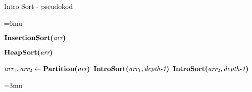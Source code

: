 \begin{frame}[squeeze]{Intro Sort - pseudokod}
	
	\begin{algorithm}[H]
		\unboldmath
		\thinmuskip=6mu
		\begin{algorithmic}[1]
			
			\State
			  \label{line:insertion-sort}
			\State $\textbf{InsertionSort(}\textit{arr}\textbf{)}$
			
			\State
			  \label{line:heap-sort}
			\State $\textbf{HeapSort(}\textit{arr}\textbf{)}$
			
			\State
			\Else {} \label{line:quick-sort}
			\State $\textit{arr}_1, \textit{arr}_2 \gets \textbf{Partition(}\textit{arr}\textbf{)}$
			\State $\textbf{IntroSort(}\textit{arr}_1, \textit{depth-1}\textbf{)}$
			\State $\textbf{IntroSort(}\textit{arr}_2, \textit{depth-1}\textbf{)}$
			\EndIf

			\EndProcedure
		\end{algorithmic}
		\boldmath
		\thinmuskip=3mu
	\end{algorithm}
	
\end{frame}